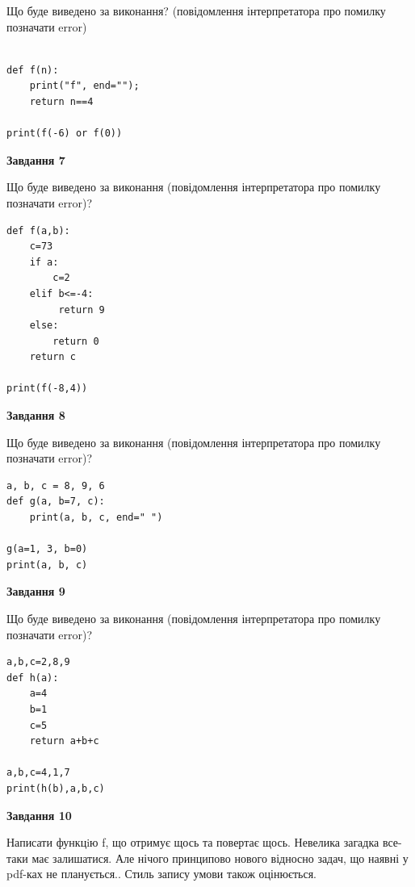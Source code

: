 \documentclass[12pt, ukrainian]{article}
\begin{document}
{\begin {large}
Що буде виведено за виконання? (повідомлення інтерпретатора про помилку позначати error)\par
\begin{verbatim}

def f(n):
    print("f", end="");
    return n==4

print(f(-6) or f(0))
\end{verbatim}

{\begin {center}\textbf{Завдання 7}\end {center}}

Що буде виведено за виконання (повідомлення інтерпретатора про помилку позначати error)?\par
\begin{verbatim}
def f(a,b):
    c=73
    if a:
        c=2
    elif b<=-4:
         return 9
    else: 
        return 0
    return c

print(f(-8,4))
\end{verbatim}

{\begin {center}\textbf{Завдання 8}\end {center}}

Що буде виведено за виконання (повідомлення інтерпретатора про помилку позначати error)?\par
\begin{verbatim}
a, b, c = 8, 9, 6
def g(a, b=7, c):
    print(a, b, c, end=" ")

g(a=1, 3, b=0)
print(a, b, c)
\end{verbatim}

{\begin {center}\textbf{Завдання 9}\end {center}}

Що буде виведено за виконання (повідомлення інтерпретатора про помилку позначати error)?\par
\begin{verbatim}
a,b,c=2,8,9
def h(a):
    a=4
    b=1
    c=5
    return a+b+c

a,b,c=4,1,7
print(h(b),a,b,c)
\end{verbatim}

{\begin {center}\textbf{Завдання 10}\end {center}}


Написати функцiю f, що отримує щось та повертає щось. Невелика загадка все-таки має залишатися. Але нічого принципово нового відносно задач, що наявні у pdf-ках не планується.. Стиль запису умови також оцінюється.\par
\end {large}}
\newpage
\end{document}
